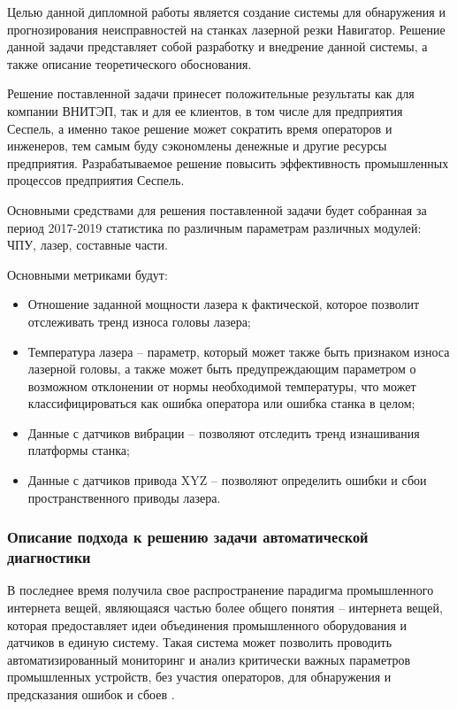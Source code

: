 Целью данной дипломной работы является создание системы
для обнаружения и прогнозирования неисправностей на станках лазерной резки Навигатор.
Решение данной задачи представляет собой
разработку и внедрение данной системы,
а также описание теоретического обоснования.

Решение поставленной задачи принесет
положительные результаты как для компании ВНИТЭП,
так и для ее клиентов, в том числе для предприятия Сеспель,
а именно такое решение может сократить
время операторов и инженеров,
тем самым буду сэкономлены денежные и другие ресурсы
предприятия.
Разрабатываемое решение повысить эффективность
промышленных процессов предприятия Сеспель.

Основными средствами для решения поставленной задачи
будет собранная за период 2017-2019 статистика
по различным параметрам различных модулей:
ЧПУ, лазер, составные части.

Основными метриками будут:

\begin{itemize}
    \item Отношение заданной мощности лазера к фактической, которое позволит
    отслеживать тренд износа головы лазера;
    \item Температура лазера -- параметр, который может также быть признаком износа
    лазерной головы, а также может быть предупреждающим параметром о возможном отклонении
    от нормы необходимой температуры, что может классифицироваться как ошибка оператора или ошибка станка в целом;
    \item Данные с датчиков вибрации -- позволяют отследить тренд изнашивания платформы станка;
    \item Данные с датчиков привода XYZ -- позволяют определить ошибки и сбои пространственного приводы лазера.
\end{itemize}




\subsubsection{Описание подхода к решению задачи автоматической диагностики}

В последнее время получила свое распространение
парадигма промышленного интернета вещей,
являющаяся частью более общего понятия -- интернета вещей,
которая предоставляет идеи объединения
промышленного оборудования и датчиков в единую систему.
Такая система может позволить проводить автоматизированный мониторинг и 
анализ критически важных параметров промышленных устройств,
без участия операторов, для обнаружения и предсказания ошибок и сбоев \cite{iiot}.

